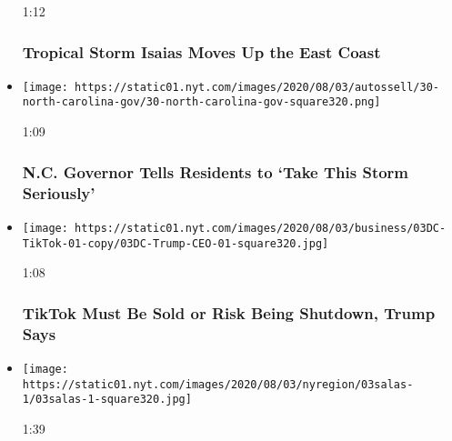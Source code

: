 \begin{itemize}
  1:12

  \hypertarget{tropical-storm-isaias-moves-up-the-east-coast}{%
  \subsubsection{Tropical Storm Isaias Moves Up the East
  Coast}\label{tropical-storm-isaias-moves-up-the-east-coast}}
\item
  \href{https://www.nytimes.com/video/us/100000007271090/north-carolina-isaias-coronavirus.html?action=click\&module=video-series-bar\&region=header\&pgtype=Article\&playlistId=video/latest-video}{}

  \texttt{[image: https://static01.nyt.com/images/2020/08/03/autossell/30-north-carolina-gov/30-north-carolina-gov-square320.png]}

  1:09

  \hypertarget{nc-governor-tells-residents-to-take-this-storm-seriously}{%
  \subsubsection{N.C. Governor Tells Residents to `Take This Storm
  Seriously'}\label{nc-governor-tells-residents-to-take-this-storm-seriously}}
\item
  \href{https://www.nytimes.com/video/us/100000007270771/trump-tiktok-shutdown-microsoft.html?action=click\&module=video-series-bar\&region=header\&pgtype=Article\&playlistId=video/latest-video}{}

  \texttt{[image: https://static01.nyt.com/images/2020/08/03/business/03DC-TikTok-01-copy/03DC-Trump-CEO-01-square320.jpg]}

  1:08

  \hypertarget{tiktok-must-be-sold-or-risk-being-shutdown-trump-says}{%
  \subsubsection{TikTok Must Be Sold or Risk Being Shutdown, Trump
  Says}\label{tiktok-must-be-sold-or-risk-being-shutdown-trump-says}}
\item
  \href{https://www.nytimes.com/video/us/100000007269993/judge-salas-new-jersey.html?action=click\&module=video-series-bar\&region=header\&pgtype=Article\&playlistId=video/latest-video}{}

  \texttt{[image: https://static01.nyt.com/images/2020/08/03/nyregion/03salas-1/03salas-1-square320.jpg]}

  1:39


\end{itemize}
